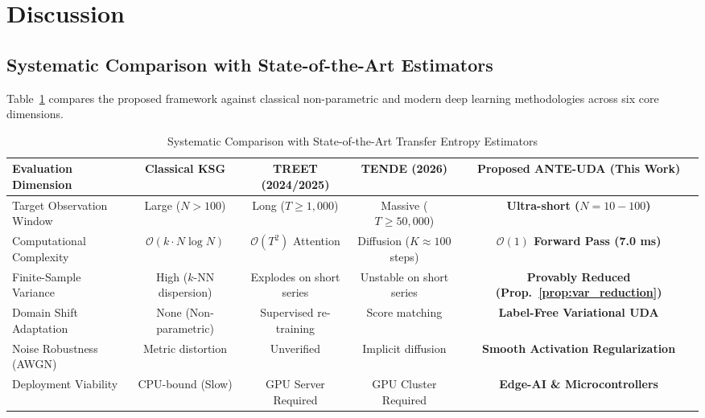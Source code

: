 \section{Discussion}

\subsection{Systematic Comparison with State-of-the-Art Estimators}
Table~\ref{tab:sota_comparison} compares the proposed framework against classical non-parametric and modern deep learning methodologies across six core dimensions.

\begin{table}[!t]
\caption{Systematic Comparison with State-of-the-Art Transfer Entropy Estimators}
\label{tab:sota_comparison}
\centering
\begin{tabular}{lcccc}
\toprule
Evaluation Dimension & Classical KSG \cite{kraskov2004estimating} & TREET (2024/2025) \cite{treet2024} & TENDE (2026) \cite{tende2025} & \textbf{Proposed ANTE-UDA (This Work)} \\
\midrule
Target Observation Window & Large ($N > 100$) & Long ($T \ge 1,000$) & Massive ($T \ge 50,000$) & \textbf{Ultra-short ($N = 10 - 100$)} \\
Computational Complexity & $\mathcal{O}(k \cdot N \log N)$ & $\mathcal{O}(T^2)$ Attention & Diffusion ($K \approx 100$ steps) & \textbf{$\mathcal{O}(1)$ Forward Pass (7.0 ms)} \\
Finite-Sample Variance & High ($k$-NN dispersion) & Explodes on short series & Unstable on short series & \textbf{Provably Reduced (Prop.~\ref{prop:var_reduction})} \\
Domain Shift Adaptation & None (Non-parametric) & Supervised re-training & Score matching & \textbf{Label-Free Variational UDA} \\
Noise Robustness (AWGN) & Metric distortion & Unverified & Implicit diffusion & \textbf{Smooth Activation Regularization} \\
Deployment Viability & CPU-bound (Slow) & GPU Server Required & GPU Cluster Required & \textbf{Edge-AI \& Microcontrollers} \\
\bottomrule
\end{tabular}
\end{table}

